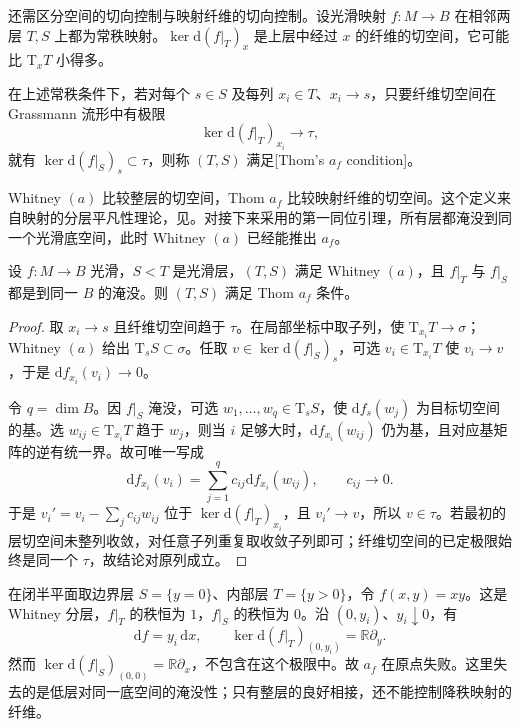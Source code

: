 还需区分空间的切向控制与映射纤维的切向控制。设光滑映射 \(f:M\to B\) 在相邻两层 \(T,S\) 上都为常秩映射。\(\ker\mathrm{d}(f|_T)_x\) 是上层中经过 \(x\) 的纤维的切空间，它可能比 \(\mathrm{T}_xT\) 小得多。

\begin{definition}\label{g2:def:thom-af}
	在上述常秩条件下，若对每个 \(s\in S\) 及每列 \(x_i\in T\)、\(x_i\to s\)，只要纤维切空间在 Grassmann 流形中有极限
	\[
		\ker\mathrm{d}(f|_T)_{x_i}\longrightarrow\tau,
	\]
	就有 \(\ker\mathrm{d}(f|_S)_s\subset\tau\)，则称 \((T,S)\) 满足[Thom's \(a_f\) condition]。
\end{definition}

Whitney \((a)\) 比较整层的切空间，Thom \(a_f\) 比较映射纤维的切空间。这个定义来自映射的分层平凡性理论，见\cite[第11节]{Mather2012TopologicalStability}。对接下来采用的第一同位引理，所有层都淹没到同一个光滑底空间，此时 Whitney \((a)\) 已经能推出 \(a_f\)。

\begin{proposition}\label{g2:prop:whitney-submersion-thom}
	设 \(f:M\to B\) 光滑，\(S<T\) 是光滑层，\((T,S)\) 满足 Whitney \((a)\)，且 \(f|_T\) 与 \(f|_S\) 都是到同一 \(B\) 的淹没。则 \((T,S)\) 满足 Thom \(a_f\) 条件。
\end{proposition}
\begin{proof}
	取 \(x_i\to s\) 且纤维切空间趋于 \(\tau\)。在局部坐标中取子列，使 \(\mathrm{T}_{x_i}T\to\sigma\)；Whitney \((a)\) 给出 \(\mathrm{T}_sS\subset\sigma\)。任取 \(v\in\ker\mathrm{d}(f|_S)_s\)，可选 \(v_i\in\mathrm{T}_{x_i}T\) 使 \(v_i\to v\)，于是 \(\mathrm{d}f_{x_i}(v_i)\to0\)。

	令 \(q=\dim B\)。因 \(f|_S\) 淹没，可选 \(w_1,\ldots,w_q\in\mathrm{T}_sS\)，使 \(\mathrm{d}f_s(w_j)\) 为目标切空间的基。选 \(w_{ij}\in\mathrm{T}_{x_i}T\) 趋于 \(w_j\)，则当 \(i\) 足够大时，\(\mathrm{d}f_{x_i}(w_{ij})\) 仍为基，且对应基矩阵的逆有统一界。故可唯一写成
	\[
		\mathrm{d}f_{x_i}(v_i)=\sum_{j=1}^q c_{ij}\mathrm{d}f_{x_i}(w_{ij}),
		\qquad c_{ij}\longrightarrow0.
	\]
	于是 \(v_i'=v_i-\sum_jc_{ij}w_{ij}\) 位于 \(\ker\mathrm{d}(f|_T)_{x_i}\)，且 \(v_i'\to v\)，所以 \(v\in\tau\)。若最初的层切空间未整列收敛，对任意子列重复取收敛子列即可；纤维切空间的已定极限始终是同一个 \(\tau\)，故结论对原列成立。
\end{proof}

\begin{example}\label{g2:exm:whitney-not-thom-af}
	在闭半平面取边界层 \(S=\{y=0\}\)、内部层 \(T=\{y>0\}\)，令 \(f(x,y)=xy\)。这是 Whitney 分层，\(f|_T\) 的秩恒为 \(1\)，\(f|_S\) 的秩恒为 \(0\)。沿 \((0,y_i)\)、\(y_i\downarrow0\)，有
	\[
		\mathrm{d}f=y_i\,\mathrm{d}x,
		\qquad\ker\mathrm{d}(f|_T)_{(0,y_i)}=\mathbb R\partial_y.
	\]
	然而 \(\ker\mathrm{d}(f|_S)_{(0,0)}=\mathbb R\partial_x\)，不包含在这个极限中。故 \(a_f\) 在原点失败。这里失去的是低层对同一底空间的淹没性；只有整层的良好相接，还不能控制降秩映射的纤维。
\end{example}

